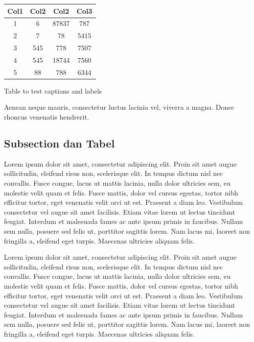 \documentclass{article}
\begin{document}
\begin{margintable}
\centering
\begin{tabular}{||c c c c||} 
 \hline
 Col1 & Col2 & Col2 & Col3 \\ [0.5ex] 
 \hline\hline
 1 & 6 & 87837 & 787 \\ 
 2 & 7 & 78 & 5415 \\
 3 & 545 & 778 & 7507 \\
 4 & 545 & 18744 & 7560 \\
 5 & 88 & 788 & 6344 \\ [1ex] 
 \hline
\end{tabular}
\captionsetup{justification=centering}
\caption{Table to test captions and labels}
\end{margintable}

Aenean neque mauris, consectetur luctus lacinia vel, viverra a magna. Donec rhoncus venenatis hendrerit.

\subsection{Subsection dan Tabel}
Lorem ipsum dolor sit amet, consectetur adipiscing elit. Proin sit amet augue sollicitudin, eleifend risus non, scelerisque elit. In tempus dictum nisl nec convallis. Fusce congue, lacus ut mattis lacinia, nulla dolor ultricies sem, eu molestie velit quam et felis. Fusce mattis, dolor vel cursus egestas, tortor nibh efficitur tortor, eget venenatis velit orci ut est. Praesent a diam leo. Vestibulum consectetur vel augue sit amet facilisis. Etiam vitae lorem ut lectus tincidunt feugiat. Interdum et malesuada fames ac ante ipsum primis in faucibus. Nullam sem nulla, posuere sed felis ut, porttitor sagittis lorem. Nam lacus mi, laoreet non fringilla a, eleifend eget turpis. Maecenas ultricies aliquam felis. 

Lorem ipsum dolor sit amet, consectetur adipiscing elit. Proin sit amet augue sollicitudin, eleifend risus non, scelerisque elit. In tempus dictum nisl nec convallis. Fusce congue, lacus ut mattis lacinia, nulla dolor ultricies sem, eu molestie velit quam et felis. Fusce mattis, dolor vel cursus egestas, tortor nibh efficitur tortor, eget venenatis velit orci ut est. Praesent a diam leo. Vestibulum consectetur vel augue sit amet facilisis. Etiam vitae lorem ut lectus tincidunt feugiat. Interdum et malesuada fames ac ante ipsum primis in faucibus. Nullam sem nulla, posuere sed felis ut, porttitor sagittis lorem. Nam lacus mi, laoreet non fringilla a, eleifend eget turpis. Maecenas ultricies aliquam felis. 
\end{document}
